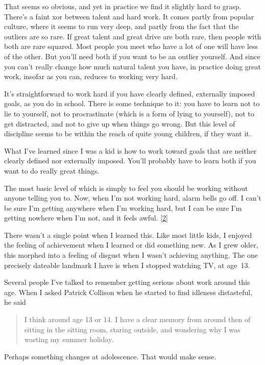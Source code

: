 That seems so obvious, and yet in practice we find it slightly hard to
grasp. There's a faint xor between talent and hard work. It comes partly
from popular culture, where it seems to run very deep, and partly from
the fact that the outliers are so rare. If great talent and great drive
are both rare, then people with both are rare squared. Most people you
meet who have a lot of one will have less of the other. But you'll need
both if you want to be an outlier yourself. And since you can't really
change how much natural talent you have, in practice doing great work,
insofar as you can, reduces to working very hard.

It's straightforward to work hard if you have clearly defined,
externally imposed goals, as you do in school. There is some technique
to it: you have to learn not to lie to yourself, not to procrastinate
(which is a form of lying to yourself), not to get distracted, and not
to give up when things go wrong. But this level of discipline seems to
be within the reach of quite young children, if they want it.

What I've learned since I was a kid is how to work toward goals that are
neither clearly defined nor externally imposed. You'll probably have to
learn both if you want to do really great things.

The most basic level of which is simply to feel you should be working
without anyone telling you to. Now, when I'm not working hard, alarm
bells go off. I can't be sure I'm getting anywhere when I'm working
hard, but I can be sure I'm getting nowhere when I'm not, and it feels
awful. {[}\hyperref[f2n]{2}{]}

There wasn't a single point when I learned this. Like most little kids,
I enjoyed the feeling of achievement when I learned or did something
new. As I grew older, this morphed into a feeling of disgust when I
wasn't achieving anything. The one precisely dateable landmark I have is
when I stopped watching TV, at age~13.

Several people I've talked to remember getting serious about work around
this age. When I asked Patrick Collison when he started to find idleness
distasteful, he said

\begin{quote}
I think around age 13 or 14. I have a clear memory from around then of
sitting in the sitting room, staring outside, and wondering why I was
wasting my summer holiday.
\end{quote}

Perhaps something changes at adolescence. That would make sense.

